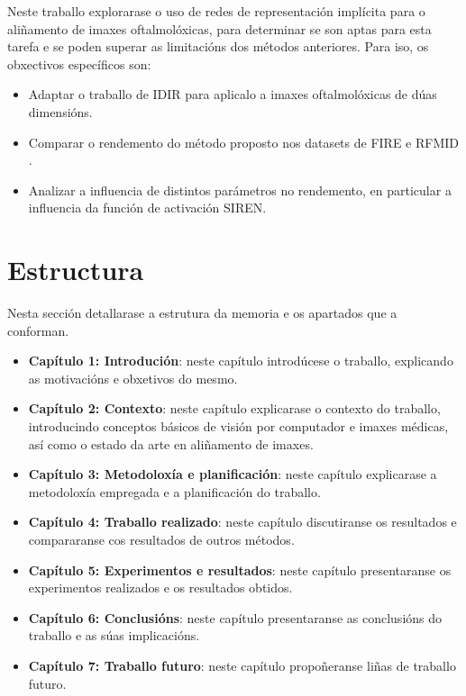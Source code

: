 Neste traballo explorarase o uso de redes de representación implícita para o aliñamento de imaxes oftalmolóxicas, para determinar se son aptas para esta tarefa e se poden superar as limitacións dos métodos anteriores.
Para iso, os obxectivos específicos son:
\begin{itemize}
    \item Adaptar o traballo de IDIR \cite{wolterink2021implicit} para aplicalo a imaxes oftalmolóxicas de dúas dimensións.
    \item Comparar o rendemento do método proposto nos datasets de FIRE \cite{FIRE} e RFMID \cite{RFMiD}.
    \item Analizar a influencia de distintos parámetros no rendemento, en particular a influencia da función de activación SIREN.
\end{itemize}

\section{Estructura }

Nesta sección detallarase a estrutura da memoria e os apartados que a conforman.

\begin{itemize}
    \item \textbf{Capítulo 1: Introdución}: neste capítulo introdúcese o traballo, explicando as motivacións e obxetivos do mesmo.
    \item \textbf{Capítulo 2: Contexto}: neste capítulo explicarase o contexto do traballo, introducindo conceptos básicos de visión por computador e imaxes médicas, así como o estado da arte en aliñamento de imaxes.
    \item \textbf{Capítulo 3: Metodoloxía e planificación}: neste capítulo explicarase a metodoloxía empregada e a planificación do traballo.
    \item \textbf{Capítulo 4: Traballo realizado}: neste capítulo discutiranse os resultados e compararanse cos resultados de outros métodos.
    \item \textbf{Capítulo 5: Experimentos e resultados}: neste capítulo presentaranse os experimentos realizados e os resultados obtidos. 
    \item \textbf{Capítulo 6: Conclusións}: neste capítulo presentaranse as conclusións do traballo e as súas implicacións.
    \item \textbf{Capítulo 7: Traballo futuro}: neste capítulo propoñeranse liñas de traballo futuro.
\end{itemize}
